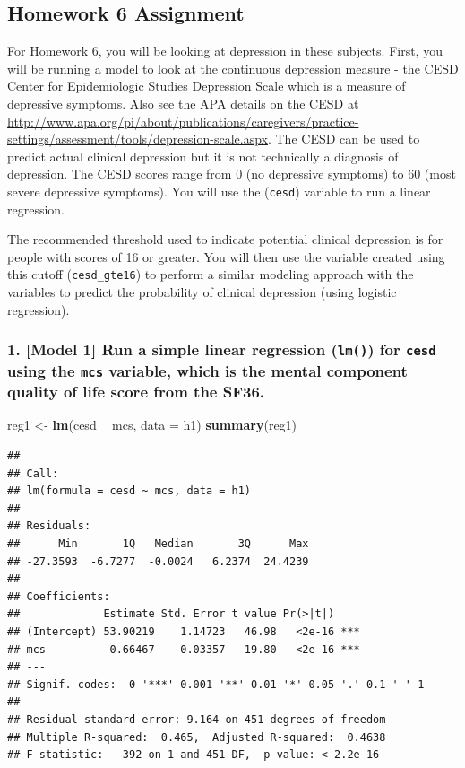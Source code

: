 \documentclass[10pt,letterpaper]{article}
\newenvironment{Shaded}{\begin{snugshade}}{\end{snugshade}}
\newcommand{\KeywordTok}[1]{\textcolor[rgb]{0.13,0.29,0.53}{\textbf{#1}}}
\newcommand{\DataTypeTok}[1]{\textcolor[rgb]{0.13,0.29,0.53}{#1}}
\newcommand{\StringTok}[1]{\textcolor[rgb]{0.31,0.60,0.02}{#1}}
\newcommand{\OperatorTok}[1]{\textcolor[rgb]{0.81,0.36,0.00}{\textbf{#1}}}
\newcommand{\NormalTok}[1]{#1}
\begin{document}
\subsection{Homework 6 Assignment}\label{homework-6-assignment}

For Homework 6, you will be looking at depression in these subjects.
First, you will be running a model to look at the continuous depression
measure - the CESD \href{http://cesd-r.com/}{Center for Epidemiologic
Studies Depression Scale} which is a measure of depressive symptoms.
Also see the APA details on the CESD at
\url{http://www.apa.org/pi/about/publications/caregivers/practice-settings/assessment/tools/depression-scale.aspx}.
The CESD can be used to predict actual clinical depression but it is not
technically a diagnosis of depression. The CESD scores range from 0 (no
depressive symptoms) to 60 (most severe depressive symptoms). You will
use the (\texttt{cesd}) variable to run a linear regression.

The recommended threshold used to indicate potential clinical depression
is for people with scores of 16 or greater. You will then use the
variable created using this cutoff (\texttt{cesd\_gte16}) to perform a
similar modeling approach with the variables to predict the probability
of clinical depression (using logistic regression).

\subsubsection{\texorpdfstring{1. {[}Model 1{]} Run a simple linear
regression (\texttt{lm()}) for \texttt{cesd} using the \texttt{mcs}
variable, which is the mental component quality of life score from the
SF36.}{1. {[}Model 1{]} Run a simple linear regression (lm()) for cesd using the mcs variable, which is the mental component quality of life score from the SF36.}}\label{model-1-run-a-simple-linear-regression-lm-for-cesd-using-the-mcs-variable-which-is-the-mental-component-quality-of-life-score-from-the-sf36.}

\begin{Shaded}
\begin{Highlighting}[]
\NormalTok{reg1 <-}\StringTok{ }\KeywordTok{lm}\NormalTok{(cesd }\OperatorTok{~}\StringTok{ }\NormalTok{mcs, }\DataTypeTok{data =}\NormalTok{ h1)}
\KeywordTok{summary}\NormalTok{(reg1)}
\end{Highlighting}
\end{Shaded}

\begin{verbatim}
## 
## Call:
## lm(formula = cesd ~ mcs, data = h1)
## 
## Residuals:
##      Min       1Q   Median       3Q      Max 
## -27.3593  -6.7277  -0.0024   6.2374  24.4239 
## 
## Coefficients:
##             Estimate Std. Error t value Pr(>|t|)    
## (Intercept) 53.90219    1.14723   46.98   <2e-16 ***
## mcs         -0.66467    0.03357  -19.80   <2e-16 ***
## ---
## Signif. codes:  0 '***' 0.001 '**' 0.01 '*' 0.05 '.' 0.1 ' ' 1
## 
## Residual standard error: 9.164 on 451 degrees of freedom
## Multiple R-squared:  0.465,  Adjusted R-squared:  0.4638 
## F-statistic:   392 on 1 and 451 DF,  p-value: < 2.2e-16
\end{verbatim}
\end{document}
